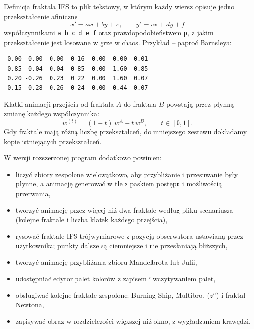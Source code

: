 \documentclass[11pt,a4paper]{article}
\newcommand{\kod}[1]{\texttt{#1}}
\newcommand{\naglowek}[1]{\par\bigskip{\large\bfseries\underline{#1}}\par\smallskip}
\begin{document}
Definicja fraktala IFS to plik tekstowy, w którym każdy wiersz opisuje jedno
przekształcenie afiniczne
\[
  x' = ax + by + e, \qquad y' = cx + dy + f
\]
współczynnikami \kod{a b c d e f} oraz prawdopodobieństwem \kod{p}, z jakim
przekształcenie jest losowane w grze w chaos. Przykład -- paproć Barnsleya:

\begin{Verbatim}
 0.00  0.00  0.00  0.16  0.00  0.00  0.01
 0.85  0.04 -0.04  0.85  0.00  1.60  0.85
 0.20 -0.26  0.23  0.22  0.00  1.60  0.07
-0.15  0.28  0.26  0.24  0.00  0.44  0.07
\end{Verbatim}

Klatki animacji przejścia od fraktala $A$ do fraktala $B$ powstają przez płynną
zmianę każdego współczynnika:
\[
  w^{(t)} = (1 - t)\, w^{A} + t\, w^{B}, \qquad t \in [0, 1] .
\]
Gdy fraktale mają różną liczbę przekształceń, do mniejszego zestawu dokładamy
kopie istniejących przekształceń.

\naglowek{Wymagania rozszerzone}

W wersji rozszerzonej program dodatkowo powinien:

\begin{itemize}
  \item liczyć zbiory zespolone wielowątkowo, aby przybliżanie i przesuwanie
        były płynne, a animację generować w tle z paskiem postępu i możliwością
        przerwania,
  \item tworzyć animację przez więcej niż dwa fraktale według pliku scenariusza
        (kolejne fraktale i liczba klatek każdego przejścia),
  \item rysować fraktale IFS trójwymiarowe z pozycją obserwatora ustawianą
        przez użytkownika; punkty dalsze są ciemniejsze i nie przesłaniają
        bliższych,
  \item tworzyć animację przybliżania zbioru Mandelbrota lub Julii,
  \item udostępniać edytor palet kolorów z zapisem i wczytywaniem palet,
  \item obsługiwać kolejne fraktale zespolone: Burning Ship, Multibrot ($z^n$)
        i fraktal Newtona,
  \item zapisywać obraz w rozdzielczości większej niż okno, z wygładzaniem
        krawędzi.
\end{itemize}
\end{document}
